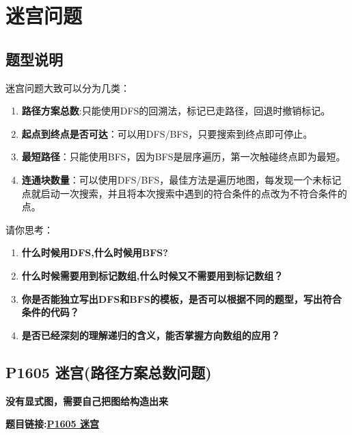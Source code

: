 \section{迷宫问题}

\subsection{题型说明}

迷宫问题大致可以分为几类：
\begin{enumerate}

\item \textbf{路径方案总数}:只能使用DFS的回溯法，标记已走路径，回退时撤销标记。
\item \textbf{起点到终点是否可达}：可以用DFS/BFS，只要搜索到终点即可停止。
\item \textbf{最短路径}：只能使用BFS，因为BFS是层序遍历，第一次触碰终点即为最短。
\item \textbf{连通块数量}：可以使用DFS/BFS，最佳方法是遍历地图，每发现一个未标记点就启动一次搜索，并且将本次搜索中遇到的符合条件的点改为不符合条件的点。
	
	
\end{enumerate}

请你思考：
\begin{enumerate}

\item \textbf{什么时候用DFS,什么时候用BFS?}
\item \textbf{什么时候需要用到标记数组,什么时候又不需要用到标记数组？}
\item \textbf{你是否能独立写出DFS和BFS的模板，是否可以根据不同的题型，写出符合条件的代码？}
\item \textbf{是否已经深刻的理解递归的含义，能否掌握方向数组的应用？}


\end{enumerate}

\newpage

\subsection{P1605 迷宫(路径方案总数问题)}

\textbf{没有显式图，需要自己把图给构造出来}

\textbf{题目链接:\href{https://www.luogu.com.cn/problem/P1605}{P1605 迷宫}}

